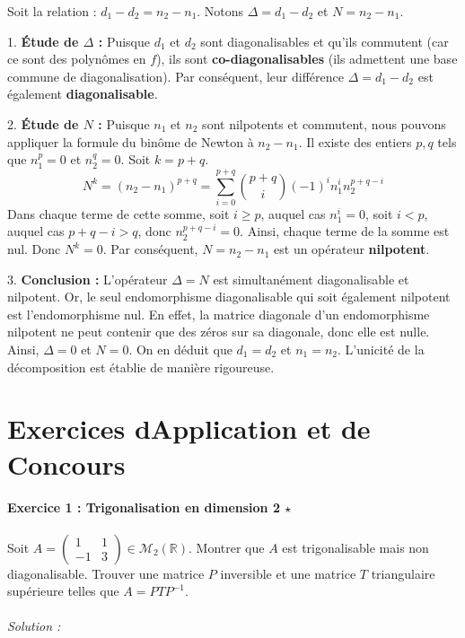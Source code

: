 \documentclass[11pt,a4paper]{article}
\begin{document}
Soit la relation : $d_1 - d_2 = n_2 - n_1$.
Notons $\Delta = d_1 - d_2$ et $N = n_2 - n_1$.

1. \textbf{Étude de $\Delta$ :}
Puisque $d_1$ et $d_2$ sont diagonalisables et qu'ils commutent (car ce sont des polynômes en $f$), ils sont \textbf{co-diagonalisables} (ils admettent une base commune de diagonalisation).
Par conséquent, leur différence $\Delta = d_1 - d_2$ est également \textbf{diagonalisable}.

2. \textbf{Étude de $N$ :}
Puisque $n_1$ et $n_2$ sont nilpotents et commutent, nous pouvons appliquer la formule du binôme de Newton à $n_2 - n_1$.
Il existe des entiers $p, q$ tels que $n_1^p = 0$ et $n_2^q = 0$.
Soit $k = p + q$.
$$ N^k = (n_2 - n_1)^{p+q} = \sum_{i=0}^{p+q} \binom{p+q}{i} (-1)^i n_1^i n_2^{p+q-i} $$
Dans chaque terme de cette somme, soit $i \geq p$, auquel cas $n_1^i = 0$, soit $i < p$, auquel cas $p+q-i > q$, donc $n_2^{p+q-i} = 0$.
Ainsi, chaque terme de la somme est nul. Donc $N^k = 0$.
Par conséquent, $N = n_2 - n_1$ est un opérateur \textbf{nilpotent}.

3. \textbf{Conclusion :}
L'opérateur $\Delta = N$ est simultanément diagonalisable et nilpotent.
Or, le seul endomorphisme diagonalisable qui soit également nilpotent est l'endomorphisme nul.
En effet, la matrice diagonale d'un endomorphisme nilpotent ne peut contenir que des zéros sur sa diagonale, donc elle est nulle.
Ainsi, $\Delta = 0$ et $N = 0$.
On en déduit que $d_1 = d_2$ et $n_1 = n_2$.
L'unicité de la décomposition est établie de manière rigoureuse.

\newpage
\part{Exercices dApplication et de Concours}
\subsection*{Exercice 1 : Trigonalisation en dimension 2 $\star$}

Soit $A = \begin{pmatrix} 1 & 1 \\ -1 & 3 \end{pmatrix} \in \mathcal{M}_2(\mathbb{R})$.
Montrer que $A$ est trigonalisable mais non diagonalisable. Trouver une matrice $P$ inversible et une matrice $T$ triangulaire supérieure telles que $A = P T P^{-1}$.

\paragraph*{Solution :}
\end{document}
